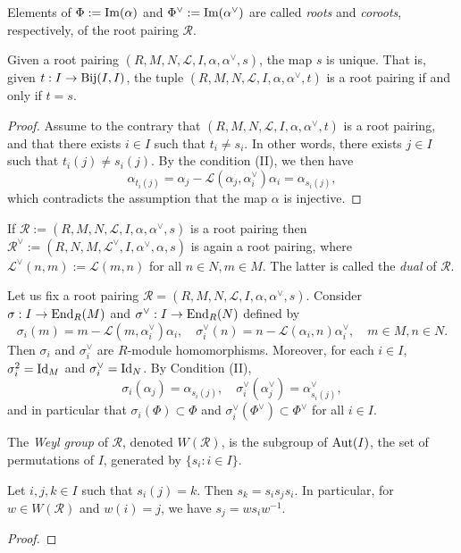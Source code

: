 Elements of $\Phi := {\rm Im}(\alpha)$ and $\Phi^\vee := {\rm Im}(\alpha^\vee)$ are called {\it roots} and {\it coroots}, 
respectively, of the root pairing $\mathcal{R}$. 

\begin{lemma}
    Given a root pairing $(R,M,N,\mathcal{L},I,\alpha, \alpha^\vee, s)$, the map $s$ is unique. 
    That is, given $t : I \to {\rm Bij}(I,I)$, the tuple $(R,M,N,\mathcal{L},I,\alpha, \alpha^\vee, t)$
    is a root pairing if and only if $t = s$.
\end{lemma}
\begin{proof}
    Assume to the contrary that $(R,M,N,\mathcal{L},I,\alpha, \alpha^\vee, t)$ is a root pairing, and that 
    there exists $i \in I$ such that $t_i \neq s_i$. In other words, there exists $j \in I$ such that
    $t_i(j) \neq s_i(j)$. By the condition (II), we then have
    \[
        \alpha_{t_i(j)} = \alpha_j - \mathcal{L}(\alpha_j,\alpha^\vee_i)\alpha_i = \alpha_{s_i(j)},
    \]
    which contradicts the assumption that the map $\alpha$ is injective.
\end{proof}
If $\mathcal{R} := (R,M,N,\mathcal{L},I,\alpha, \alpha^\vee,s)$ is 
a root pairing then $\mathcal{R}^\vee := (R,N,M,\mathcal{L}^\vee,I,\alpha^\vee, \alpha,s)$ is again 
a root pairing, where $\mathcal{L}^\vee (n,m) := \mathcal{L}(m,n)$ for all $n \in N,m \in M$. The 
latter is called the {\it dual} of $\mathcal{R}$.

Let us fix a root pairing $\mathcal{R} = (R,M,N,\mathcal{L},I,\alpha, \alpha^\vee,s)$. Consider $\sigma: I \to {\rm End}_R(M)$ and 
$\sigma^\vee : I \to {\rm End}_R(N)$ defined by
\[
    \sigma_i(m) = m - \mathcal{L}(m,\alpha^\vee_i)\alpha_i, \quad \sigma^\vee_i(n) = n - \mathcal{L}(\alpha_i,n)\alpha^\vee_i, \quad m \in M, n \in N.
\]
Then $\sigma_i$ and $\sigma^\vee_i$ are $R$-module homomorphisms. Moreover, 
for each $i \in I$, $\sigma_i^2 = {\rm Id}_M$ and $\sigma_i^\vee = {\rm Id}_N$. By Condition (II), 
\[
    \sigma_i(\alpha_j) = \alpha_{s_i(j)}, \quad \sigma^\vee_i(\alpha^\vee_j) = \alpha^\vee_{s_i(j)},
\]
and in particular that $\sigma_i(\Phi) \subset \Phi$ and 
$\sigma_i^\vee(\Phi^\vee) \subset \Phi^\vee$ for all $i \in I$.

\begin{definition}
    The {\it Weyl group} of $\mathcal{R}$, denoted $W(\mathcal{R})$, is the subgroup of ${\rm Aut}(I)$, the set of 
    permutations of $I$, generated by $\{s_i : i \in I\}$. 
\end{definition}
\begin{lemma}
    Let $i,j,k \in I$ such that $s_i(j) = k$. Then $s_k = s_is_js_i$. In particular, for 
    $w \in W(\mathcal{R})$ and $w(i) = j$, we have $s_j = ws_iw^{-1}$. 
\end{lemma}
\begin{proof}

\end{proof}

